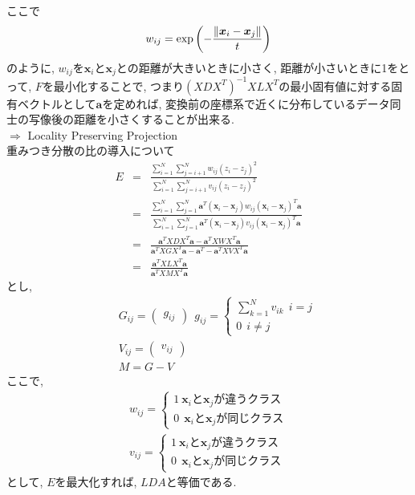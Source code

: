 \documentclass[dvipdfmx,a4j]{jsarticle}
\begin{document}
ここで
\begin{eqnarray*}
    w_{ij}={\rm exp}\left(-\frac{\|\bm{x}_{i}-\bm{x}_{j}\|}{t}\right)
\end{eqnarray*}
のように, $w_{ij}$を$\bm{x}_{i}$と$\bm{x}_{j}$との距離が大きいときに小さく, 距離が小さいときに1をとって, $F$を最小化することで, つまり$(XDX^{T})^{-1}XLX^{T}$の最小固有値に対する固有ベクトルとして$\bm{a}$を定めれば, 変換前の座標系で近くに分布しているデータ同士の写像後の距離を小さくすることが出来る.\\
$\Rightarrow$ Locality Preserving Projection\\[1cm]
重みつき分散の比の導入について
\begin{eqnarray*}
    E&=&\frac{\displaystyle \sum_{i=1}^{N}\sum_{j=i+1}^{N}w_{ij}(z_{i}-z_{j})^{2}}{\displaystyle \sum_{i=1}^{N}\sum_{j=i+1}^{N}v_{ij}(z_{i}-z_{j})^{2}}\\
     &=&\frac{\displaystyle \sum_{i=1}^{N}\sum_{j=1}^{N}\bm{a}^{T}(\bm{x}_{i}-\bm{x}_{j})w_{ij}(\bm{x}_{i}-\bm{x}_{j})^{T}\bm{a}}{\displaystyle \sum_{i=1}^{N}\sum_{j=1}^{N}\bm{a}^{T}(\bm{x}_{i}-\bm{x}_{j})v_{ij}(\bm{x}_{i}-\bm{x}_{j})^{T}\bm{a}}\\
     &=&\frac{\bm{a}^{T}XDX^{T}\bm{a}-\bm{a}^{T}XWX^{T}\bm{a}}{\bm{a}^{T}XGX^{T}\bm{a}-\bm{a}^{T}-\bm{a}^{T}XVX^{T}\bm{a}}\\
     &=&\frac{\bm{a}^{T}XLX^{T}\bm{a}}{\bm{a}^{T}XMX^{T}\bm{a}}
\end{eqnarray*}
とし,
\begin{eqnarray*}
    &&G_{ij}=\begin{pmatrix}g_{ij}\end{pmatrix}\ \ g_{ij}=\left\{ \begin{array}{l} \displaystyle \sum_{k=1}^{N}v_{ik}\ \ i=j\\ 0\ \ i\neq j \end{array} \right.\\
    &&V_{ij}=\begin{pmatrix}v_{ij}\end{pmatrix}\\
    &&M=G-V
\end{eqnarray*}
ここで,
\begin{eqnarray*}
    w_{ij}=\left\{ \begin{array}{l} 1 \ \bm{x}_{i}と\bm{x}_{j}が違うクラス\\ 0\ \ \bm{x}_{i}と\bm{x}_{j}が同じクラス\end{array} \right.\\
    v_{ij}=\left\{ \begin{array}{l} 1 \ \bm{x}_{i}と\bm{x}_{j}が違うクラス\\ 0\ \ \bm{x}_{i}と\bm{x}_{j}が同じクラス\end{array} \right.   
\end{eqnarray*}
として, $E$を最大化すれば, $LDA$と等価である.
\end{document}
